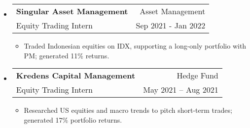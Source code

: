 \documentclass[letterpaper, 11pt]{article}
\makeatletter
\def\sectionlineskip{\medskip}
\def\sectionskip{\medskip}
\newcommand{\SectionHeading}[1]{
  \sectionskip
  \raggedright\raggedbottom\MakeUppercase{\large{#1}}
  \sectionlineskip
  \hrule
  \color{black}
}
\newcommand{\ResumeEntryTSDL}[4]{
  \vspace{1pt}\item
    \begin{tabular*}{\textwidth}[t]{l@{\extracolsep{\fill}}r} 
      \textbf{#1} & #2 \\
      #3 & #4 \\
    \end{tabular*}\vspace{-2.835pt} %
}
\newcommand{\ResumeItemDefault}[1]{
  \item{
    #1 \vspace{-2.835pt}
  }
}
\newcommand{\ResumeEntryStart}{\begin{itemize}[leftmargin=0mm, label={}]}
\newcommand{\ResumeEntryEnd}{\end{itemize}\vspace{-2.835pt}} %
\newcommand{\ResumeItemListStart}{\begin{itemize}[leftmargin=5mm, label=$\bullet$, itemsep=1mm, parsep=1mm]} %
\newcommand{\ResumeItemListEnd}{\end{itemize}}
\newcommand{\OpenSourceProjectItem}[3]{
  \item{
    \href{#1}{\textbf{#2} }\hfill{#3}\vspace{-2.835pt}
  }
}
\makeatother
\begin{document}


  \ResumeEntryStart
    \ResumeEntryTSDL{Singular Asset Management}{Asset Management}{Equity Trading Intern}{Sep 2021 - Jan 2022}
    \ResumeItemListStart
      \ResumeItemDefault{Traded Indonesian equities on IDX, supporting a long-only portfolio with PM; generated 11\% returns.}
    \ResumeItemListEnd
  \ResumeEntryEnd

  \ResumeEntryStart
  \ResumeEntryTSDL{Kredens Capital Management}{Hedge Fund}{Equity Trading Intern}{May 2021 – Aug 2021}
    \ResumeItemListStart
      \ResumeItemDefault{Researched US equities and macro trends to pitch short-term trades; generated 17\% portfolio returns.}
    \ResumeItemListEnd
  \ResumeEntryEnd
\end{document}
